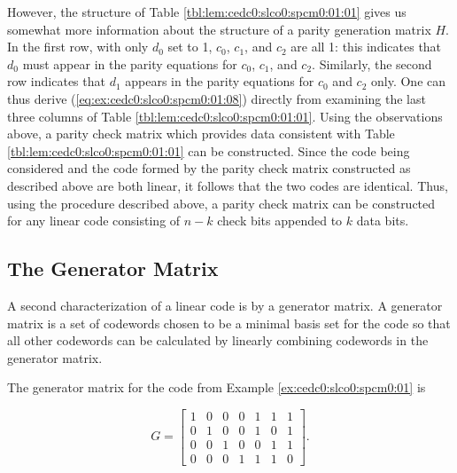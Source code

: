 \begin{vworklemmaproof}
However, the structure of Table \ref{tbl:lem:cedc0:slco0:spcm0:01:01}
gives us somewhat more information about the structure of a parity
generation matrix $H$.  In the first row, with only $d_0$ set to 1, 
$c_0$, $c_1$, and $c_2$ are all 1:  this indicates that $d_0$ must appear in the
parity equations for $c_0$, $c_1$, and $c_2$.  Similarly, the second row indicates
that $d_1$ appears in the parity equations for $c_0$ and $c_2$ only.
One can thus derive (\ref{eq:ex:cedc0:slco0:spcm0:01:08}) directly
from examining the last three columns of Table \ref{tbl:lem:cedc0:slco0:spcm0:01:01}.
Using the observations above, a parity check matrix which provides data consistent
with Table \ref{tbl:lem:cedc0:slco0:spcm0:01:01} can be constructed.  Since
the code being considered and the code formed by the parity check matrix 
constructed as described above are both linear, it follows that the two codes
are identical.  Thus, using the procedure described above,
a parity check matrix can be constructed for any linear code consisting of 
$n-k$ check bits appended to $k$ data bits.
\end{vworklemmaproof}
\vworklemmafooter{}


\subsection{The Generator Matrix}
\label{cedc0:slco0:sgma0}

A second characterization of a linear code is
by a generator matrix.  A generator matrix is 
a set of codewords chosen to be a minimal basis set for the code so that
all other codewords can be calculated by linearly combining codewords
in the generator matrix.

The generator matrix for the code from Example \ref{ex:cedc0:slco0:spcm0:01} is

\begin{equation}
\label{eq:cedc0:slco0:sgma0:01}
G = \left[
    \begin{array}{ccccccc}
        1   &  0    &  0    &  0    &  1    &  1    &  1    \\
        0   &  1    &  0    &  0    &  1    &  0    &  1    \\
        0   &  0    &  1    &  0    &  0    &  1    &  1    \\
        0   &  0    &  0    &  1    &  1    &  1    &  0 
    \end{array}
    \right] .
\end{equation}

